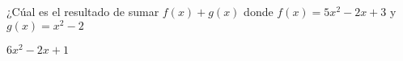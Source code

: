 
\question ¿Cúal es el resultado de sumar $f(x) + g(x)$ donde
          $f(x) = 5x^2 - 2x + 3$ y $g(x) = x^2 -2$

  \begin{solution}[2cm]
    $6x^2 - 2x + 1$
  \end{solution}
